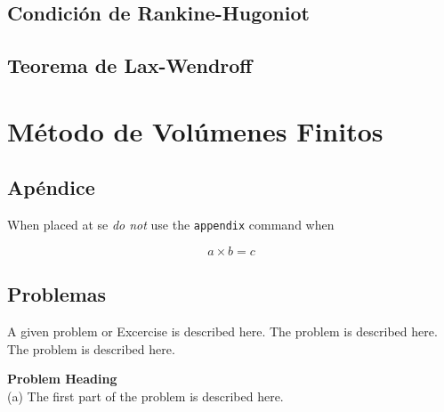 \section{Condición de Rankine-Hugoniot}
\section{Teorema de Lax-Wendroff}

\chapter{Método de Volúmenes Finitos}

\section*{Apéndice}
%
When placed at se \textit{do not} use the \verb|appendix| command when

\begin{equation}
    a \times b = c
\end{equation}
\section*{Problemas}
%
\begin{prob}
    \label{prob1}
    A given problem or Excercise is described here. The
    problem is described here. The problem is described here.
\end{prob}

\begin{prob}
    \label{prob2}
    \textbf{Problem Heading}\\
    (a) The first part of the problem is described here.
\end{prob}


